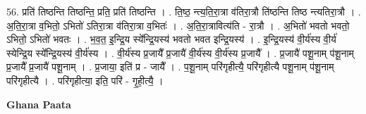 \documentclass[17pt]{extarticle}
\begin{document}
56. प्रति॑ तिष्ठन्ति तिष्ठन्ति॒ प्रति॒ प्रति॑ तिष्ठन्ति । . ति॒ष्ठ॒ न्त्य॒ति॒रा॒त्रा व॑तिरा॒त्रौ ति॑ष्ठन्ति तिष्ठ न्त्यतिरा॒त्रौ । . अ॒ति॒रा॒त्रा व॒भितो॒ ऽभितो॑ ऽतिरा॒त्रा व॑तिरा॒त्रा व॒भितः॑ । . अ॒ति॒रा॒त्रावित्य॑ति - रा॒त्रौ । . अ॒भितो॑ भवतो भवतो॒ ऽभितो॒ ऽभितो॑ भवतः । . भ॒व॒त॒ इ॒न्द्रि॒य स्ये᳚न्द्रि॒यस्य॑ भवतो भवत इन्द्रि॒यस्य॑ । . इ॒न्द्रि॒यस्य॑ वी॒र्य॑स्य वी॒र्य॑ स्येन्द्रि॒य स्ये᳚न्द्रि॒यस्य॑ वी॒र्य॑स्य । . वी॒र्य॑स्य प्र॒जायै᳚ प्र॒जायै॑ वी॒र्य॑स्य वी॒र्य॑स्य प्र॒जायै᳚ । . प्र॒जायै॑ पशू॒नाम् प॑शू॒नाम् प्र॒जायै᳚ प्र॒जायै॑ पशू॒नाम् । . प्र॒जाया॒ इति॑ प्र - जायै᳚ । . प॒शू॒नाम् परि॑गृहीत्यै॒ परि॑गृहीत्यै पशू॒नाम् प॑शू॒नाम् परि॑गृहीत्यै । . परि॑गृहीत्या॒ इति॒ परि॑ - गृ॒ही॒त्यै॒ । \newline

\textbf{Ghana Paata } \newline
\end{document}
